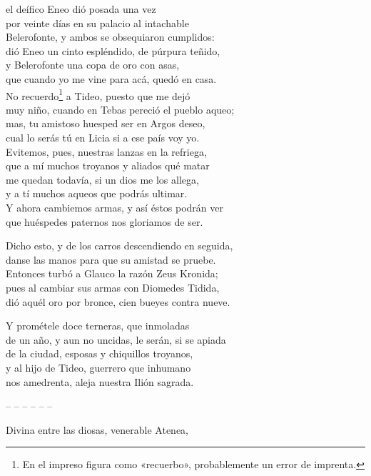 el deífico Eneo dió posada una vez\\
por veinte días en su palacio al intachable\\
Belerofonte, y ambos se obsequiaron cumplidos:\\
dió Eneo un cinto espléndido, de púrpura teñido,\\
y Belerofonte una copa de oro con asas,\\
que cuando yo me vine para acá, quedó en casa.\\
No recuerdo\footnote{En el impreso figura como «recuerbo», probablemente un error de imprenta.} a Tideo, puesto que me dejó\\
muy niño, cuando en Tebas pereció el pueblo aqueo;\\
mas, tu amistoso huesped ser en Argos deseo,\\
cual lo serás tú en Licia si a ese país voy yo.\\
Evitemos, pues, nuestras lanzas en la refriega,\\
que a mí muchos troyanos y aliados qué matar\\
me quedan todavía, si un dios me los allega,\\
y a tí muchos aqueos que podrás ultimar.\\
Y ahora cambiemos armas, y así éstos podrán ver\\
que huéspedes paternos nos gloriamos de ser.\par
\pend
\separator
%
\pstart
{}
Dicho esto, y de los carros descendiendo en seguida,\\
danse las manos para que su amistad se pruebe.\\
Entonces turbó a Glauco la razón Zeus Kronida;\\
pues al cambiar sus armas con Diomedes Tidida,\\
dió aquél oro por bronce, cien bueyes contra nueve.\par
\pend
\separator
%
\pstart
{}
Y prométele doce terneras, que inmoladas\\
de un año, y aun no uncidas, le serán, si se apiada\\
de la ciudad, esposas y chiquillos troyanos,\\
y al hijo de Tideo, guerrero que inhumano\\
nos amedrenta, aleja nuestra Ilión sagrada.\par
\pend
\noindent-- -- -- -- -- --\par
%
\pstart
{}
Divina entre las diosas, venerable Atenea,\\
